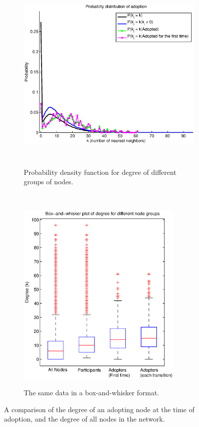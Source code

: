 \documentclass[12pt]{article}
\begin{document}
\begin{figure}[H]
    \begin{subfigure}[b]{.6\textwidth}
\includegraphics[trim = 2cm 0cm 0cm 0cm, height = 9cm]{Graficos/PkGivenAdopt.eps}
\label{fig:PkgA}
\caption{Probability density function for degree of different groups of nodes.}
    \end{subfigure}
    ~
    \begin{subfigure}[b]{.4\textwidth}
\includegraphics[trim = .5cm 1.4cm 0cm 0cm, height =9cm]{Graficos/PkGivenAdoptBox.eps}
\label{fig:PkGivenAdoptBox}
\caption{The same data in a box-and-whisker format.}
    \end{subfigure}
    \caption{A comparison of the degree of an adopting node at the time of adoption, and the degree of all nodes in the network.}
\end{figure}
\end{document}
